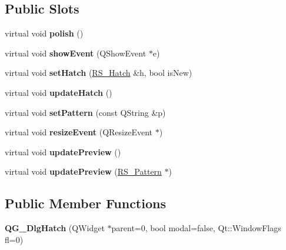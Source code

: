 \subsection*{Public Slots}
\begin{DoxyCompactItemize}
\item 
\hypertarget{classQG__DlgHatch_a7d46de79f4b14544aea4b9c41a7080dc}{virtual void {\bfseries polish} ()}\label{classQG__DlgHatch_a7d46de79f4b14544aea4b9c41a7080dc}

\item 
\hypertarget{classQG__DlgHatch_ad464196cdf5c73f051d0252a0dc57b9b}{virtual void {\bfseries show\-Event} (Q\-Show\-Event $\ast$e)}\label{classQG__DlgHatch_ad464196cdf5c73f051d0252a0dc57b9b}

\item 
\hypertarget{classQG__DlgHatch_a6ca197c0d0529e06ca1ebaf7cb29b3f7}{virtual void {\bfseries set\-Hatch} (\hyperlink{classRS__Hatch}{R\-S\-\_\-\-Hatch} \&h, bool is\-New)}\label{classQG__DlgHatch_a6ca197c0d0529e06ca1ebaf7cb29b3f7}

\item 
\hypertarget{classQG__DlgHatch_a289e17f82b417723e6a6dddff6867c60}{virtual void {\bfseries update\-Hatch} ()}\label{classQG__DlgHatch_a289e17f82b417723e6a6dddff6867c60}

\item 
\hypertarget{classQG__DlgHatch_a9e5232ca9f36a011391f0878d607857d}{virtual void {\bfseries set\-Pattern} (const Q\-String \&p)}\label{classQG__DlgHatch_a9e5232ca9f36a011391f0878d607857d}

\item 
\hypertarget{classQG__DlgHatch_aa74865e2a1f986eb8b5f0689993ed835}{virtual void {\bfseries resize\-Event} (Q\-Resize\-Event $\ast$)}\label{classQG__DlgHatch_aa74865e2a1f986eb8b5f0689993ed835}

\item 
\hypertarget{classQG__DlgHatch_acf42b307151abfe9f6386aee1eade0e9}{virtual void {\bfseries update\-Preview} ()}\label{classQG__DlgHatch_acf42b307151abfe9f6386aee1eade0e9}

\item 
\hypertarget{classQG__DlgHatch_ae3594415f5a06934a9f1c195c9cece67}{virtual void {\bfseries update\-Preview} (\hyperlink{classRS__Pattern}{R\-S\-\_\-\-Pattern} $\ast$)}\label{classQG__DlgHatch_ae3594415f5a06934a9f1c195c9cece67}

\end{DoxyCompactItemize}
\subsection*{Public Member Functions}
\begin{DoxyCompactItemize}
\item 
\hypertarget{classQG__DlgHatch_af7cc432c883adbd026d97c26c0636678}{{\bfseries Q\-G\-\_\-\-Dlg\-Hatch} (Q\-Widget $\ast$parent=0, bool modal=false, Qt\-::\-Window\-Flags fl=0)}\label{classQG__DlgHatch_af7cc432c883adbd026d97c26c0636678}

\end{DoxyCompactItemize}
